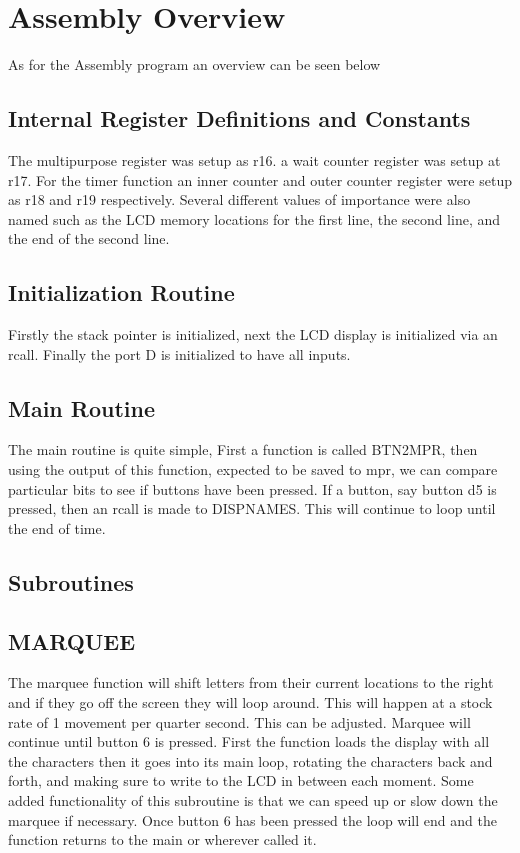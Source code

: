 \documentclass[12pt,letterpaper]{article}
\begin{document}
\begin{figure}[h]
	\centering
\end{figure}
	
\section{Assembly Overview}
As for the Assembly program an overview can be seen below

\subsection{Internal Register Definitions and Constants}
The multipurpose register was setup as r16. a wait counter register was setup at r17. For the timer function an inner counter and outer counter register were setup as r18 and r19 respectively. Several different values of importance were also named such as the LCD memory locations for the first line, the second line, and the end of the second line. 

\subsection{Initialization Routine}
Firstly the stack pointer is initialized, next the LCD display is initialized via an rcall. Finally the port D is initialized to have all inputs. 

\subsection{Main Routine}
The main routine is quite simple, First a function is called BTN2MPR, then using the output of this function, expected to be saved to mpr, we can compare particular bits to see if buttons have been pressed. If a button, say button d5 is pressed, then an rcall is made to DISPNAMES. This will continue to loop until the end of time. 


\subsection{Subroutines}
	\subsection{MARQUEE}
	The marquee function will shift letters from their current locations to the right and if they go off the screen they will loop around. This will happen at a stock rate of 1 movement per quarter second. This can be adjusted. Marquee will continue until button 6 is pressed. First the function loads the display with all the characters then it goes into its main loop, rotating the characters back and forth, and making sure to write to the LCD in between each moment. Some added functionality of this subroutine is that we can speed up or slow down the marquee if necessary. Once button 6 has been pressed the loop will end and the function returns to the main or wherever called it. 
	
\end{document}
